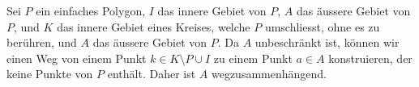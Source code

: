 \begin{lemma}
    Sei $P$ ein einfaches Polygon, $I$ das innere Gebiet von $P$, $A$ das äussere Gebiet von $P$, und $K$ das innere Gebiet eines Kreises, welche $P$ umschliesst, ohne es zu berühren, und $A$ das äussere Gebiet von $P$. 
    Da $A$ unbeschränkt ist, können wir einen Weg von einem Punkt $k \in K \setminus P \cup I$ zu einem Punkt $a \in A$ konstruieren, der keine Punkte von $P$ enthält. 
    Daher ist $A$ wegzusammenhängend.
\end{lemma}